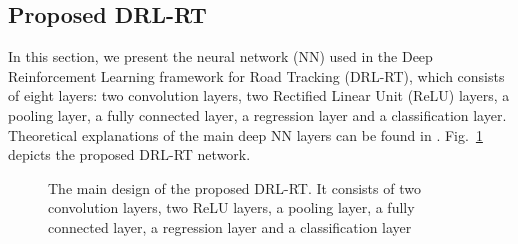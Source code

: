 \documentclass{svproc}
\begin{document}
	
	\subsection{Proposed DRL-RT} 
	In this section, we present the neural network (NN) used in the Deep Reinforcement Learning framework for Road Tracking (DRL-RT), which consists of eight layers: two convolution layers, two Rectified Linear Unit (ReLU) layers, a pooling layer, a fully connected layer, a regression layer and a classification layer. Theoretical explanations of the main deep NN layers can be found in \cite{omar2018deep}. Fig.~\ref{Fig:Deep_Reinf_Net} depicts the proposed DRL-RT network.
	
	\begin{figure}[!h]
		\vspace{-2ex}
		\centering
		\vspace{-2ex}
		\begin{scriptsize}	
			\caption{The main design of the proposed DRL-RT. It consists of two convolution layers, two ReLU layers, a pooling layer, a fully connected layer, a regression layer and a classification layer\label{Fig:Deep_Reinf_Net}}
		\end{scriptsize}
	\end{figure}
	
\end{document}

